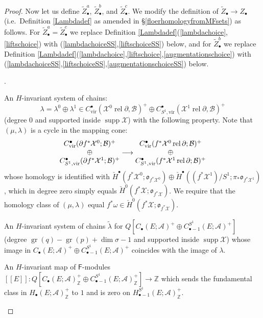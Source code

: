 \documentclass[12pt]{article}
\theoremstyle{definition}
\theoremstyle{remark}
\numberwithin{equation}{subsection}
\newcommand{\oo}{\mathfrak o}
\newcommand{\X}{\mathcal X}
\newcommand{\ZZ}{\mathbb Z}
\newcommand{\A}{\mathcal A}
\newcommand{\B}{\mathcal B}
\newcommand{\cH}{\check H}
\newcommand{\sF}{\mathsf{F}}
\newcommand{\supp}{\operatorname{supp}}
\newcommand{\vir}{\mathrm{vir}}
\newcommand{\gr}{\operatorname{gr}}
\newcommand{\rel}{\operatorname{rel}}
\newcounter{rcounti}
\newenvironment{rlist}{\begin{list}{\roman{rcounti}.}{\usecounter{rcounti}
\setlength\itemsep{0pt}
\setlength\labelsep{4pt}
\setlength\labelwidth{16pt}
\setlength\leftmargin{32pt}
\setlength\listparindent{0pt}
\setlength\parsep{0pt}
\setlength\parskip{0pt}
\setlength\partopsep{0pt}
\setlength\rightmargin{0pt}
\setlength\topsep{0pt}
\setlength\itemindent{0pt}
}}{\end{list}}
\begin{document}
\begin{proof}
Now let us define $\tilde Z_\bullet^a$, $\tilde Z_\bullet^b$, and $\tilde Z_\bullet^c$.  We modify the definition of $\tilde Z_\bullet\to Z_\bullet$ (i.e.\ Definition \ref{Lambdadef} as amended in \S\ref{floerhomologyfromMFsets}) as follows.  For $\tilde Z_\bullet^a=\tilde Z_\bullet^c$ we replace Definition \ref{Lambdadef}(\ref{lambdachoice},\ref{liftschoice}) with (\ref{lambdachoiceSS},\ref{liftschoiceSS}) below, and for $\tilde Z_\bullet^b$ we replace Definition \ref{Lambdadef}(\ref{lambdachoice},\ref{liftschoice},\ref{augmentationschoice}) with (\ref{lambdachoiceSS},\ref{liftschoiceSS},\ref{augmentationschoiceSS}) below.
\begin{rlist}
\item\label{lambdachoiceSS}An $H$-invariant system of chains:
\begin{equation*}%
\lambda=\lambda^0\oplus\lambda^1\in C^\bullet_\vir(\X^0\rel\partial,\B)^+\oplus C^\bullet_{S^1,\vir}(\X^1\rel\partial,\B)^+
\end{equation*}
(degree $0$ and supported inside $\supp\X$) with the following property.  Note that $(\mu,\lambda)$ is a cycle in the mapping cone:
\begin{equation*}%
\begin{matrix}
C^\bullet_\vir(\partial f^\ast\X^0;\B)^+\cr\oplus\cr C^\bullet_{S^1,\vir}(\partial f^\ast\X^1;\B)^+
\end{matrix}
\longrightarrow
\begin{matrix}
C^\bullet_{\vir}(f^\ast\X^0\rel\partial;\B)^+\cr\oplus\cr C^\bullet_{S^1,\vir}(f^\ast\X^1\rel\partial;\B)^+
\end{matrix}
\end{equation*}
whose homology is identified with $\cH^\bullet(f^\ast\X^0;\oo_{f^\ast\X^0})\oplus\cH^\bullet((f^\ast\X^1)/S^1;\pi_\ast\oo_{f^\ast\X^1})$, which in degree zero simply equals $\cH^0(f^\ast\X;\oo_{f^\ast\X})$.  We require that the homology class of $(\mu,\lambda)$ equal $f^\ast\omega\in\cH^0(f^\ast\X;\oo_{f^\ast\X})$.
\item\label{liftschoiceSS}An $H$-invariant system of chains $\tilde\lambda$ for $Q[C_\bullet(E;\A)^+\oplus C_{\bullet-1}^{S^1}(E;\A)^+]$ (degree $\gr(q)-\gr(p)+\dim\sigma-1$ and supported inside $\supp\X$) whose image in $C_\bullet(E;\A)^+\oplus C_{\bullet-1}^{S^1}(E;\A)^+$ coincides with the image of $\lambda$.
\item\label{augmentationschoiceSS}An $H$-invariant map of $\sF$-modules $[[E]]:Q[C_\bullet(E;\A)^+_\ZZ\oplus C_{\bullet-1}^{S^1}(E;\A)^+_\ZZ]\to\ZZ$ which sends the fundamental class in $H_\bullet(E;\A)^+_\ZZ$ to $1$ and is zero on $H_{\bullet-1}^{S^1}(E;\A)^+_\ZZ$.

\end{rlist}
\end{proof}
\end{document}
